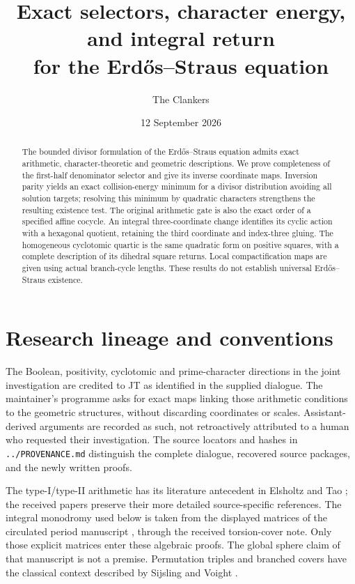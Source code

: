 \documentclass[11pt,a4paper]{article}
\title{Exact selectors, character energy, and integral return\\
for the Erd\H{o}s--Straus equation}
\author{The Clankers}
\date{12 September 2026}
\theoremstyle{definition}
\begin{document}
\maketitle
\begin{abstract}
The bounded divisor formulation of the Erd\H{o}s--Straus equation admits
exact arithmetic, character-theoretic and geometric descriptions. We prove
completeness of the first-half denominator selector and give its inverse
coordinate maps. Inversion parity yields an exact collision-energy minimum
for a divisor distribution avoiding all solution targets; resolving this
minimum by quadratic characters strengthens the resulting existence test.
The original arithmetic gate is also the exact order of a specified affine
cocycle. An integral three-coordinate change identifies its cyclic action
with a hexagonal quotient, retaining the third coordinate and index-three
gluing. The homogeneous cyclotomic quartic is the same quadratic form on
positive squares, with a complete description of its dihedral square returns.
Local compactification maps are given using actual branch-cycle lengths.
These results do not establish universal Erd\H{o}s--Straus existence.
\end{abstract}
\tableofcontents
\clearpage
\section{Research lineage and conventions}
The Boolean, positivity, cyclotomic and prime-character directions in the
joint investigation are credited to JT as identified in the supplied
dialogue. The maintainer's programme asks for exact maps linking those
arithmetic conditions to the geometric structures, without discarding
coordinates or scales. Assistant-derived arguments are recorded as such,
not retroactively attributed to a human who requested their investigation.
The source locators and hashes in \texttt{../PROVENANCE.md} distinguish the
complete dialogue, recovered source packages, and the newly written proofs.

The type-I/type-II arithmetic has its literature antecedent in Elsholtz
and Tao \cite{et}; the received papers preserve their more detailed
source-specific references. The integral monodromy used below is taken
from the displayed matrices of the circulated period manuscript
\cite{period}, through the received torsion-cover note. Only those explicit
matrices enter these algebraic proofs. The global sphere claim of that
manuscript is not a premise. Permutation triples and branched covers have
the classical context described by Sijsling and Voight \cite{sv}.
\end{document}
